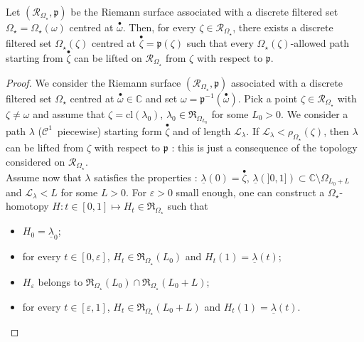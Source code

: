 \documentclass[11pt, english]{smfart}
\theoremstyle{definition}
\begin{document}
\begin{prop}\label{Propequiv}
Let $(\mathscr{R}_{\Omega_\star}, \mathfrak{p})$ be the Riemann
surface associated with a  discrete filtered set $\Omega_\star =
\Omega_\star (\omega)$ centred at  ${ {\stackrel{\bullet}{\omega}} }$.
Then, for every $\zeta  \in \mathscr{R}_{\Omega_\star}$, there
exists a  discrete filtered set $\Omega_\star (\zeta)$ centred at
${ {\stackrel{\bullet}{\zeta}} } = \mathfrak{p}(\zeta)$ such that
every $\Omega_\star (\zeta)$-allowed path starting from ${ {\stackrel{\bullet}{\zeta}} }$ can be lifted
  on $\mathscr{R}_{\Omega_\star}$ from $\zeta$ with respect to $\mathfrak{p}$.
\end{prop}

\begin{proof}
We consider the Riemann
surface  $(\mathscr{R}_{\Omega_\star}, \mathfrak{p})$  associated with a
discrete filtered set $\Omega_\star$ centred 
at ${ {\stackrel{\bullet}{\omega}} } \in \mathbb{C}$ and set $\omega =
\mathfrak{p}^{-1}({ {\stackrel{\bullet}{\omega}} })$.  Pick a point
 $\zeta  \in \mathscr{R}_{\Omega_\star}$ with $\zeta \neq \omega$ and
 assume that $\zeta = \mathrm{cl}(\lambda_0)$, 
$\lambda_0 \in \mathfrak{R}_{\Omega_{L_0}}$ for some
$L_0>0$. We consider a path $\lambda$  ($\mathcal{C}^1$~piecewise) 
starting form ${ {\stackrel{\bullet}{\zeta}} }$ and of length
$\mathcal{L}_\lambda$. 
If $\mathcal{L}_\lambda < \rho_{\Omega_\star}(\zeta)$, then  $\lambda$ can
be lifted from $\zeta$ with respect to $\mathfrak{p}$ : this is just a consequence
of the topology considered on  $\mathscr{R}_{\Omega_\star}$.\\
Assume now that $\lambda$ satisfies the properties :
$\underline{\lambda}(0) = { {\stackrel{\bullet}{\zeta}} }$, $\underline{\lambda}(]0,1])
\subset  \mathbb{C}\setminus \Omega_{L_0+L}$ and  $\mathcal{L}_\lambda
< L$ for some  $L>0$. For $\varepsilon >0$ small enough, one can construct
a $\Omega_\star$-homotopy
${ H : t \in [0,1] \mapsto H_t \in
  \mathfrak{R}_{\Omega_\star}  }$
such that
\begin{itemize}
\item $H_0 = \underline{\lambda}_0$;
\item for every $t \in [0,\varepsilon]$,  $H_t \in
   \mathfrak{R}_{\Omega_\star}(L_0)$ and $H_t(1) = \underline{\lambda}(t)$;
\item $H_\varepsilon$ belongs to  $\mathfrak{R}_{\Omega_\star}(L_0) \cap
  \mathfrak{R}_{\Omega_\star}(L_0+L)$;
\item for every $t \in [\varepsilon,1]$, $H_t \in
\mathfrak{R}_{\Omega_\star}(L_0+L)$ and  $H_t(1) = \underline{\lambda}(t)$.

\end{itemize}
\end{proof}
\end{document}
